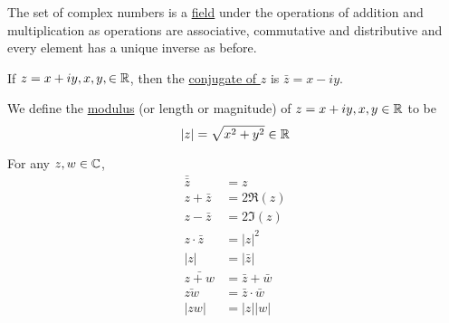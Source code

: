 \documentclass[11pt]{article}
\begin{document}
\begin{remark}
	The set of complex numbers is a \underline{field} under the operations of
	addition and multiplication as operations are associative, commutative
	and distributive and every element has a unique inverse as before.
\end{remark}
\begin{definition}
	If $z = x + iy, x, y, \in \mathbb{R}$, then the \underline{conjugate of $z$} is
	$\bar{z} = x - iy$.
\end{definition}
\begin{definition}
	We define the \underline{modulus} (or length or magnitude) of $z = x + iy,
	x, y \in \mathbb{R}$ to be
	\begin{equation*}
		|z| = \sqrt{x^2 + y^2} \in \mathbb{R}
	\end{equation*}
\end{definition}
\begin{remark}
	For any $z, w \in \mathbb{C}$,
	\begin{align*}
		\bar{\bar{z}} &= z\\
		z + \bar{z} &= 2\Re(z)\\
		z - \bar{z} &= 2\Im(z)\\
		z\cdot\bar{z} &= |z|^2\\
		|z| &= |\bar{z}|\\
		\bar{z+w} &= \bar z + \bar w\\
		\bar{zw} &= \bar z\cdot\bar w\\
		|zw| &= |z||w|
	\end{align*}
\end{remark}
\end{document}
